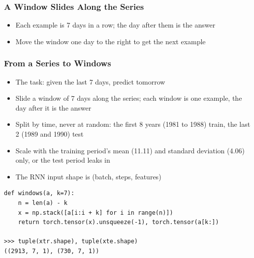 \begin{frame}[fragile]\frametitle{A Window Slides Along the Series}
\begin{itemize}
\item Each example is 7 days in a row; the day after them is the answer
\item Move the window one day to the right to get the next example
\end{itemize}
\begin{center}
\end{center}
\end{frame}

\begin{frame}[fragile]\frametitle{From a Series to Windows}
\begin{itemize}
\item The task: given the last 7 days, predict tomorrow
\item Slide a window of 7 days along the series; each window is one example, the day after it is the answer
\item Split by time, never at random: the first 8 years (1981 to 1988) train, the last 2 (1989 and 1990) test
\item Scale with the training period's mean (11.11) and standard deviation (4.06) only, or the test period leaks in
\item The RNN input shape is (batch, steps, features)
\end{itemize}
\begin{lstlisting}
def windows(a, k=7):
    n = len(a) - k
    x = np.stack([a[i:i + k] for i in range(n)])
    return torch.tensor(x).unsqueeze(-1), torch.tensor(a[k:])

>>> tuple(xtr.shape), tuple(xte.shape)
((2913, 7, 1), (730, 7, 1))
\end{lstlisting}
\end{frame}

